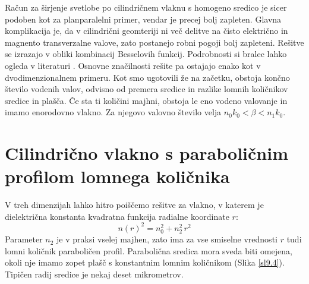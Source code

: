 \documentclass[11pt,fleqn]{book} %
\begin{document}
Račun za širjenje svetlobe po cilindričnem vlaknu s homogeno sredico
je sicer podoben kot za planparalelni primer, vendar je precej bolj
zapleten. Glavna komplikacija je, da v cilindrični geomteriji ni več
delitve na čisto električno in magnento transverzalne valove, zato
postanejo robni pogoji bolj zapleteni. Rešitve se izrazajo v obliki
kombinacij Besselovih funkcij. Podrobnosti si bralec lahko ogleda
v literaturi \cite{vlakna}. Osnovne značilnosti rešite pa ostajajo
enako kot v dvodimenzionalnem primeru. Kot smo ugotovili že na začetku,
obstoja končno število vodenih valov, odvisno od premera sredice in
razlike lomnih količnikov sredice in plašča. Če sta ti količini majhni,
obstoja le eno vodeno valovanje in imamo enorodovno vlakno. Za njegovo
valovno število velja $n_{0}k_{0}<\beta<n_{1}k_{0}$.


\section{Cilindrično vlakno s paraboličnim profilom lomnega količnika}

V treh dimenzijah lahko hitro poiščemo rešitve za vlakno, v katerem
je dielektrična konstanta kvadratna funkcija radialne koordinate $r$:
\begin{equation}
n\left(r\right)^{2}=n_{0}^{2}+n_{2}^{2}\, r^{2}\label{9.15}
\end{equation}
 Parameter $n_{2}$ je v praksi vselej majhen, zato ima za vse smiselne
vrednosti $r$ tudi lomni količnik paraboličen profil. Parabolična
sredica mora sveda biti omejena, okoli nje imamo zopet plašč s konstantnim
lomnim količnikom (Slika \ref{sl9.4}). Tipičen radij sredice je nekaj
deset mikrometrov.
\end{document}
